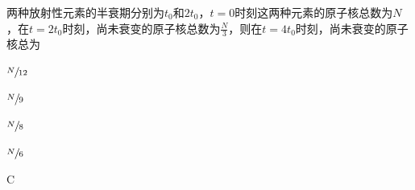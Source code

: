 两种放射性元素的半衰期分别为\(t_0\)和\(2t_0\)，\(t = 0\)时刻这两种元素的原子核总数为\(N\)，在\(t=2t_0\)时刻，尚未衰变的原子核总数为\(\frac{N}{3}\)，则在\(t=4t_0\)时刻，尚未衰变的原子核总为\paren[]
\begin{choices}
	\item \(\sfrac{N}{12}\)
	\item \(\sfrac{N}{9}\)
	\item \(\sfrac{N}{8}\)
	\item \(\sfrac{N}{6}\)
\end{choices}
\begin{answer}
	C
\end{answer}